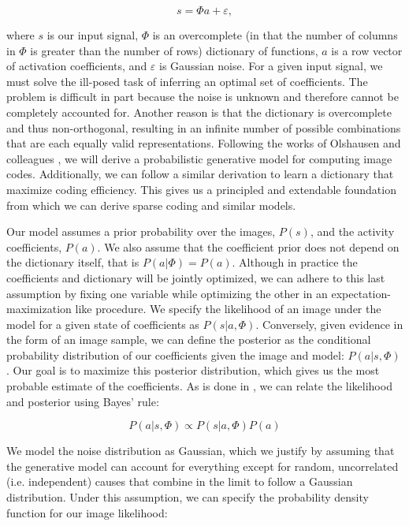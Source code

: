 \begin{equation} \label{eq:ch2_generative_model}
    s = \Phi a + \varepsilon,
\end{equation}

\noindent where $s$ is our input signal, $\Phi$ is an overcomplete (in that the number of columns in $\Phi$ is greater than the number of rows) dictionary of functions, $a$ is a row vector of activation coefficients, and $\varepsilon$ is Gaussian noise. For a given input signal, we must solve the ill-posed task of inferring an optimal set of coefficients. The problem is difficult in part because the noise is unknown and therefore cannot be completely accounted for. Another reason is that the dictionary is overcomplete and thus non-orthogonal, resulting in an infinite number of possible combinations that are each equally valid representations. Following the works of Olshausen and colleagues \parencite{olshausen1996learning, olshausen2003principles, karklin1999porbabilistic}, we will derive a probabilistic generative model for computing image codes. Additionally, we can follow a similar derivation to learn a dictionary that maximize coding efficiency. This gives us a principled and extendable foundation from which we can derive sparse coding and similar models.

Our model assumes a prior probability over the images, $P(s)$, and the activity coefficients, $P(a)$. We also assume that the coefficient prior does not depend on the dictionary itself, that is $P(a|\Phi) = P(a)$. Although in practice the coefficients and dictionary will be jointly optimized, we can adhere to this last assumption by fixing one variable while optimizing the other in an expectation-maximization like procedure. We specify the likelihood of an image under the model for a given state of coefficients as $P(s|a,\Phi)$. Conversely, given evidence in the form of an image sample, we can define the posterior as the conditional probability distribution of our coefficients given the image and model: $P(a|s,\Phi)$. Our goal is to maximize this posterior distribution, which gives us the most probable estimate of the coefficients. As is done in \parencite{karklin1999porbabilistic}, we can relate the likelihood and posterior using Bayes' rule:

\begin{equation}\label{eq:ch2_bayes}
    P(a|s,\Phi) \propto P(s|a,\Phi) P(a)
\end{equation}

We model the noise distribution as Gaussian, which we justify by assuming that the generative model can account for everything except for random, uncorrelated (i.e. independent) causes that combine in the limit to follow a Gaussian distribution. Under this assumption, we can specify the probability density function for our image likelihood:

